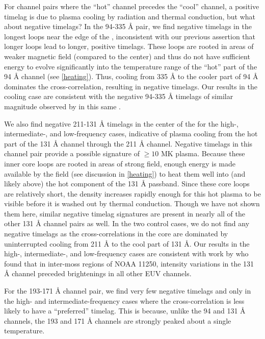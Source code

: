For channel pairs where the ``hot'' channel precedes the ``cool'' channel, a positive timelag is due to plasma cooling by radiation and thermal conduction, but what about negative timelags? In the 94-335 \AA{} pair, we find negative timelags in the longest loops near the edge of the \AR{}, inconsistent with our previous assertion that longer loops lead to longer, positive timelags. These loops are rooted in areas of weaker magnetic field (compared to the center) and thus do not have sufficient energy to evolve significantly into the temperature range of the ``hot'' part of the 94 \AA{} channel (see \autoref{heating}). Thus, cooling from 335 \AA{} to the cooler part of 94 \AA{} dominates the cross-correlation, resulting in negative timelags. Our results in the cooling case are consistent with the negative 94-335 \AA{} timelags of similar magnitude observed by \citet{viall_survey_2017} in this same \AR{}.

We also find negative 211-131 \AA{} timelags in the center of the \AR{} for the high-, intermediate-, and low-frequency cases, indicative of plasma cooling from the hot part of the 131 \AA{} channel through the 211 \AA{} channel. Negative timelags in this channel pair provide a possible signature of $\ge10$ MK plasma. Because these inner core loops are rooted in areas of strong field, enough energy is made available by the field (see discussion in \autoref{heating}) to heat them well into (and likely above) the hot component of the 131 \AA{} passband. Since these core loops are relatively short, the density increases rapidly enough for this hot plasma to be visible before it is washed out by thermal conduction. Though we have not shown them here, similar negative timelag signatures are present in nearly all of the other 131 \AA{} channel pairs as well. In the two control cases, we do not find any negative timelags as the cross-correlations in the core are dominated by uninterrupted cooling from 211 \AA{} to the cool part of 131 \AA{}. Our results in the high-, intermediate-, and low-frequency cases are consistent with work by \citet{cadavid_heating_2014} who found that in inter-moss regions of \AR{} NOAA 11250, intensity variations in the 131 \AA{} channel preceded brightenings in all other EUV channels. 

For the 193-171 \AA{} channel pair, we find very few negative timelags and only in the high- and intermediate-frequency cases where the cross-correlation is less likely to have a ``preferred'' timelag. This is because, unlike the 94 and 131 \AA{} channels, the 193 and 171 \AA{} channels are strongly peaked about a single temperature.

